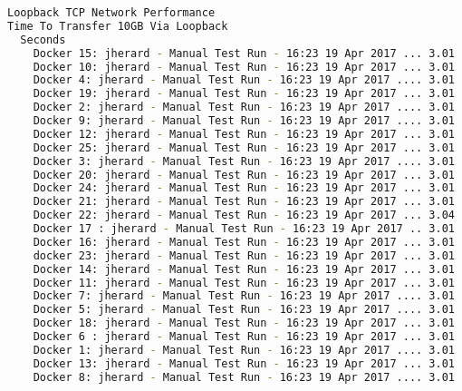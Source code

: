 \documentclass[french]{article}
\begin{document}
\begin{lstlisting}[language=bash,caption={}]
Loopback TCP Network Performance 
Time To Transfer 10GB Via Loopback
  Seconds
    Docker 15: jherard - Manual Test Run - 16:23 19 Apr 2017 ... 3.01 |========
    Docker 10: jherard - Manual Test Run - 16:23 19 Apr 2017 ... 3.01 |========
    Docker 4: jherard - Manual Test Run - 16:23 19 Apr 2017 .... 3.01 |========
    Docker 19: jherard - Manual Test Run - 16:23 19 Apr 2017 ... 3.01 |========
    Docker 2: jherard - Manual Test Run - 16:23 19 Apr 2017 .... 3.01 |========
    Docker 9: jherard - Manual Test Run - 16:23 19 Apr 2017 .... 3.01 |========
    Docker 12: jherard - Manual Test Run - 16:23 19 Apr 2017 ... 3.01 |========
    Docker 25: jherard - Manual Test Run - 16:23 19 Apr 2017 ... 3.01 |========
    Docker 3: jherard - Manual Test Run - 16:23 19 Apr 2017 .... 3.01 |========
    Docker 20: jherard - Manual Test Run - 16:23 19 Apr 2017 ... 3.01 |========
    Docker 24: jherard - Manual Test Run - 16:23 19 Apr 2017 ... 3.01 |========
    Docker 21: jherard - Manual Test Run - 16:23 19 Apr 2017 ... 3.01 |========
    Docker 22: jherard - Manual Test Run - 16:23 19 Apr 2017 ... 3.04 |========
    Docker 17 : jherard - Manual Test Run - 16:23 19 Apr 2017 .. 3.01 |========
    Docker 16: jherard - Manual Test Run - 16:23 19 Apr 2017 ... 3.01 |========
    docker 23: jherard - Manual Test Run - 16:23 19 Apr 2017 ... 3.01 |========
    Docker 14: jherard - Manual Test Run - 16:23 19 Apr 2017 ... 3.01 |========
    Docker 11: jherard - Manual Test Run - 16:23 19 Apr 2017 ... 3.01 |========
    Docker 7: jherard - Manual Test Run - 16:23 19 Apr 2017 .... 3.01 |========
    Docker 5: jherard - Manual Test Run - 16:23 19 Apr 2017 .... 3.01 |========
    Docker 18: jherard - Manual Test Run - 16:23 19 Apr 2017 ... 3.01 |========
    Docker 6 : jherard - Manual Test Run - 16:23 19 Apr 2017 ... 3.01 |========
    Docker 1: jherard - Manual Test Run - 16:23 19 Apr 2017 .... 3.01 |========
    Docker 13: jherard - Manual Test Run - 16:23 19 Apr 2017 ... 3.01 |========
    Docker 8: jherard - Manual Test Run - 16:23 19 Apr 2017 .... 3.01 |========



\end{lstlisting}
\end{document}

